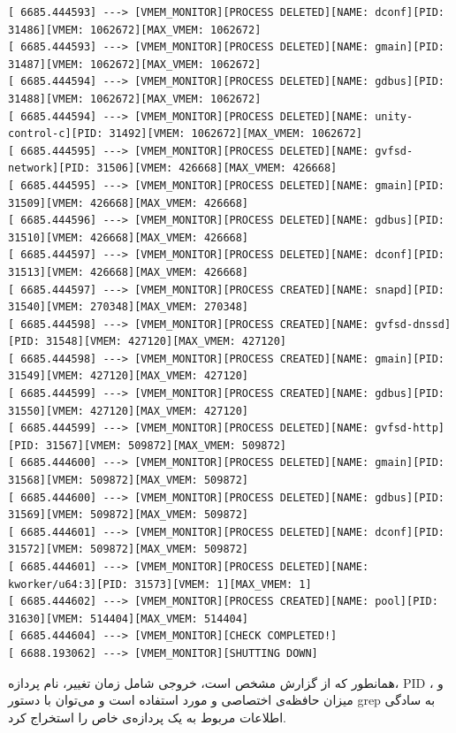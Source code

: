 \documentclass{article}
\begin{document}
\begin{latin}
\begin{verbatim}
[ 6685.444593] ---> [VMEM_MONITOR][PROCESS DELETED][NAME: dconf][PID: 31486][VMEM: 1062672][MAX_VMEM: 1062672]
[ 6685.444593] ---> [VMEM_MONITOR][PROCESS DELETED][NAME: gmain][PID: 31487][VMEM: 1062672][MAX_VMEM: 1062672]
[ 6685.444594] ---> [VMEM_MONITOR][PROCESS DELETED][NAME: gdbus][PID: 31488][VMEM: 1062672][MAX_VMEM: 1062672]
[ 6685.444594] ---> [VMEM_MONITOR][PROCESS DELETED][NAME: unity-control-c][PID: 31492][VMEM: 1062672][MAX_VMEM: 1062672]
[ 6685.444595] ---> [VMEM_MONITOR][PROCESS DELETED][NAME: gvfsd-network][PID: 31506][VMEM: 426668][MAX_VMEM: 426668]
[ 6685.444595] ---> [VMEM_MONITOR][PROCESS DELETED][NAME: gmain][PID: 31509][VMEM: 426668][MAX_VMEM: 426668]
[ 6685.444596] ---> [VMEM_MONITOR][PROCESS DELETED][NAME: gdbus][PID: 31510][VMEM: 426668][MAX_VMEM: 426668]
[ 6685.444597] ---> [VMEM_MONITOR][PROCESS DELETED][NAME: dconf][PID: 31513][VMEM: 426668][MAX_VMEM: 426668]
[ 6685.444597] ---> [VMEM_MONITOR][PROCESS CREATED][NAME: snapd][PID: 31540][VMEM: 270348][MAX_VMEM: 270348]
[ 6685.444598] ---> [VMEM_MONITOR][PROCESS CREATED][NAME: gvfsd-dnssd][PID: 31548][VMEM: 427120][MAX_VMEM: 427120]
[ 6685.444598] ---> [VMEM_MONITOR][PROCESS CREATED][NAME: gmain][PID: 31549][VMEM: 427120][MAX_VMEM: 427120]
[ 6685.444599] ---> [VMEM_MONITOR][PROCESS CREATED][NAME: gdbus][PID: 31550][VMEM: 427120][MAX_VMEM: 427120]
[ 6685.444599] ---> [VMEM_MONITOR][PROCESS DELETED][NAME: gvfsd-http][PID: 31567][VMEM: 509872][MAX_VMEM: 509872]
[ 6685.444600] ---> [VMEM_MONITOR][PROCESS DELETED][NAME: gmain][PID: 31568][VMEM: 509872][MAX_VMEM: 509872]
[ 6685.444600] ---> [VMEM_MONITOR][PROCESS DELETED][NAME: gdbus][PID: 31569][VMEM: 509872][MAX_VMEM: 509872]
[ 6685.444601] ---> [VMEM_MONITOR][PROCESS DELETED][NAME: dconf][PID: 31572][VMEM: 509872][MAX_VMEM: 509872]
[ 6685.444601] ---> [VMEM_MONITOR][PROCESS DELETED][NAME: kworker/u64:3][PID: 31573][VMEM: 1][MAX_VMEM: 1]
[ 6685.444602] ---> [VMEM_MONITOR][PROCESS CREATED][NAME: pool][PID: 31630][VMEM: 514404][MAX_VMEM: 514404]
[ 6685.444604] ---> [VMEM_MONITOR][CHECK COMPLETED!]
[ 6688.193062] ---> [VMEM_MONITOR][SHUTTING DOWN]

\end{verbatim}
\end{latin}
 همانطور که از گزارش مشخص است، خروجی شامل زمان تغییر، نام پردازه، PID ، و میزان حافظه‌ی اختصاصی و مورد استفاده است و می‌توان با دستور grep به سادگی اطلاعات مربوط به یک پردازه‌ی خاص را استخراج کرد.
 
\end{document}

